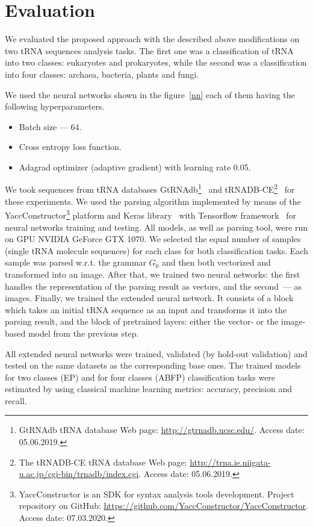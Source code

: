 \section{Evaluation}
We evaluated the proposed approach with the described above modifications on two tRNA sequences analysis tasks.
The first one was a classification of tRNA into two classes: eukaryotes and prokaryotes, while the second was a classification into four classes: archaea, bacteria, plants and fungi.

We used the neural networks shown in the figure~\ref{nn} each of them having the following hyperparameters.
\begin{itemize}
    \item Batch size --- 64.
    \item Cross entropy loss function.
    \item Adagrad optimizer (adaptive gradient) with learning rate 0.05.
\end{itemize}


We took sequences from tRNA databases GtRNAdb\footnote{GtRNAdb tRNA database Web page: \url{http://gtrnadb.ucsc.edu/}. Access date: 05.06.2019.}~\cite{chan2016gtrnadb} and tRNADB-CE\footnote{The tRNADB-CE tRNA database Web page: \url{http://trna.ie.niigata-u.ac.jp/cgi-bin/trnadb/index.cgi}. Access date: 05.06.2019.}~\cite{abe2014trnadb} for these experiments.
We used the parsing algorithm implemented by means of the YaccConstructor\footnote{YaccConstructor is an SDK for syntax analysis tools development. Project repository on GitHub: \url{https://github.com/YaccConstructor/YaccConstructor}. Access date: 07.03.2020.} platform and Keras library~\cite{chollet2015keras} with Tensorflow framework~\cite{tensorflow2015-whitepaper} for neural networks training and testing.
All models, as well as parsing tool, were run on GPU NVIDIA GeForce GTX 1070.
We selected the equal number of samples (single tRNA molecule sequences) for each class for both classification tasks.
Each sample was parsed w.r.t. the grammar $G_0$ and then both vectorized and transformed into an image.
After that, we trained two neural networks: the first handles the representation of the parsing result as vectors, and the second~--- as images.
Finally, we trained the extended neural network.
It consists of a block which takes an initial tRNA sequence as an input and transforms it into the parsing result, and the block of pretrained layers: either the vector- or the image-based model from the previous step. 

All extended neural networks were trained, validated (by hold-out validation) and tested on the same datasets as the corresponding base ones.
The trained models for two classes (EP) and for four classes (ABFP) classification tasks were estimated by using classical machine learning metrics: accuracy, precision and recall.

